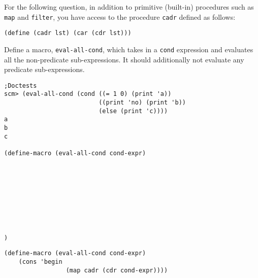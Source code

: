 \begin{blocksection}
For the following question, in addition to primitive (built-in) procedures such as \texttt{map} and \texttt{filter}, you have access to the procedure \texttt{cadr} defined as follows:

\begin{lstlisting}
(define (cadr lst) (car (cdr lst)))
\end{lstlisting}
\end{blocksection}

\begin{blocksection}
\question Define a macro, \texttt{eval-all-cond}, which takes in a \texttt{cond} expression and evaluates all the non-predicate sub-expressions. It should additionally not evaluate any predicate sub-expressions.
\begin{lstlisting}
;Doctests
scm> (eval-all-cond (cond ((= 1 0) (print 'a))
                          ((print 'no) (print 'b))
                          (else (print 'c))))
a
b
c

(define-macro (eval-all-cond cond-expr)









)
\end{lstlisting}


\begin{solution}
\begin{lstlisting}
(define-macro (eval-all-cond cond-expr)
    (cons 'begin
                 (map cadr (cdr cond-expr))))
\end{lstlisting}
\end{solution}
\end{blocksection}
